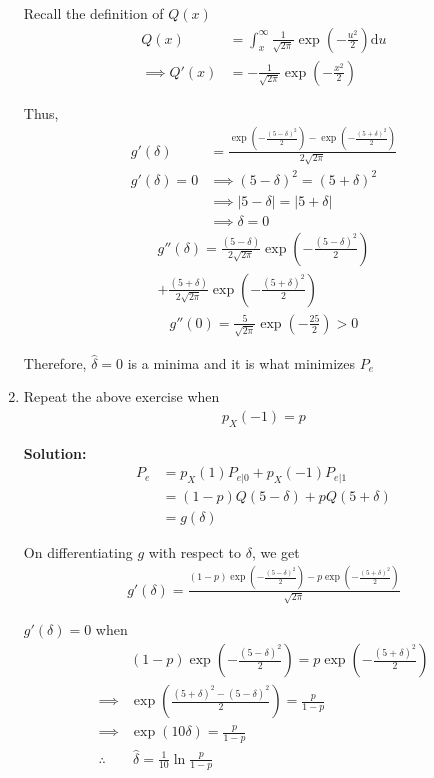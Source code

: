 \documentclass[journal,12pt,twocolumn]{IEEEtran}
\newcommand{\solution}{\noindent \textbf{Solution: }}
\providecommand{\brak}[1]{\ensuremath{\left(#1\right)}}
\providecommand{\der}[1]{\mathrm{d} #1}
\numberwithin{equation}{section}
\renewcommand\thesection{\arabic{section}}
\begin{document}
\begin{enumerate}[label=\thesection.\arabic*,ref=\thesection.\theenumi]
	Recall the definition of $Q(x)$
	\begin{align}
		Q(x) &= \int_x^\infty \frac{1}{\sqrt{2\pi}} \exp\brak{-\frac{u^2}{2}} \der{u} \\
		\implies Q'(x) &= - \frac{1}{\sqrt{2\pi}} \exp\brak{-\frac{x^2}{2}}
	\end{align}
	
	Thus,
	\begin{align}
		g'(\delta) &= \frac{\exp\brak{-\frac{(5-\delta)^2}{2}} - \exp\brak{-\frac{(5+\delta)^2}{2}}}{2\sqrt{2\pi}} \\
		g'(\delta) = 0 &\implies (5-\delta)^2 = (5+\delta)^2 \\
		&\implies |5-\delta| = |5+\delta| \\
		&\implies \delta = 0
	\end{align}
	\begin{multline}
		g''(\delta) = \frac{(5-\delta)}{2\sqrt{2\pi}} \exp\brak{-\frac{(5-\delta)^2}{2}} \\+ \frac{(5+\delta)}{2\sqrt{2\pi}} \exp\brak{-\frac{(5+\delta)^2}{2}}
	\end{multline}
	\begin{align}
		g''(0) = \frac{5}{\sqrt{2\pi}} \exp\brak{-\frac{25}{2}} > 0
	\end{align}
	
	Therefore, $\hat{\delta} = 0$ is a minima and it is what minimizes $P_e$
	
	\item Repeat the above exercise when 
	\begin{align}
		p_{X}(-1) = p
	\end{align}
	
	\solution	
	\begin{align}
		P_e &= p_X(1) P_{e|0} + p_X(-1) P_{e|1} \\
		&= (1-p) Q(5-\delta) + p Q(5+\delta) \\
		&= g(\delta)
	\end{align}
	
	On differentiating $g$ with respect to $\delta$, we get
	\begin{align}
		g'(\delta) = \frac{(1-p)\exp\brak{-\frac{(5-\delta)^2}{2}} - p\exp\brak{-\frac{(5+\delta)^2}{2}}}{\sqrt{2\pi}} 
	\end{align}
	
	$g'(\delta) = 0$ when
	\begin{align}
			&(1-p)\exp\brak{-\frac{(5-\delta)^2}{2}} = p\exp\brak{-\frac{(5+\delta)^2}{2}} \\
			\implies &\exp\brak{\frac{(5+\delta)^2 - (5-\delta)^2}{2}} = \frac{p}{1-p} \\
			\implies &\exp\brak{10\delta} = \frac{p}{1-p} \\
			\therefore &~\hat{\delta} = \frac{1}{10} \ln\frac{p}{1-p}
	\end{align}
	

\end{enumerate}
\end{document}
